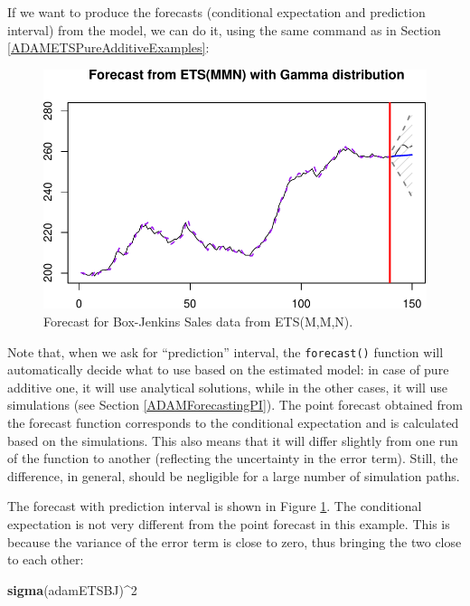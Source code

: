 \documentclass[]{book}
\newenvironment{Shaded}{\begin{snugshade}}{\end{snugshade}}
\newcommand{\DecValTok}[1]{\textcolor[rgb]{0.00,0.00,0.81}{#1}}
\newcommand{\KeywordTok}[1]{\textcolor[rgb]{0.13,0.29,0.53}{\textbf{#1}}}
\newcommand{\NormalTok}[1]{#1}
\newcommand{\OperatorTok}[1]{\textcolor[rgb]{0.81,0.36,0.00}{\textbf{#1}}}
\theoremstyle{definition}
\theoremstyle{definition}
\theoremstyle{definition}
\theoremstyle{definition}
\theoremstyle{remark}
\begin{document}
If we want to produce the forecasts (conditional expectation and prediction interval) from the model, we can do it, using the same command as in Section \ref{ADAMETSPureAdditiveExamples}:

\begin{figure}
\centering
\includegraphics{Svetunkov--2022----ADAM_files/figure-latex/BJSalesadamETSMMNForecast-1.pdf}
\caption{\label{fig:BJSalesadamETSMMNForecast}Forecast for Box-Jenkins Sales data from ETS(M,M,N).}
\end{figure}

Note that, when we ask for ``prediction'' interval, the \texttt{forecast()} function will automatically decide what to use based on the estimated model: in case of pure additive one, it will use analytical solutions, while in the other cases, it will use simulations (see Section \ref{ADAMForecastingPI}). The point forecast obtained from the forecast function corresponds to the conditional expectation and is calculated based on the simulations. This also means that it will differ slightly from one run of the function to another (reflecting the uncertainty in the error term). Still, the difference, in general, should be negligible for a large number of simulation paths.

The forecast with prediction interval is shown in Figure \ref{fig:BJSalesadamETSMMNForecast}. The conditional expectation is not very different from the point forecast in this example. This is because the variance of the error term is close to zero, thus bringing the two close to each other:

\begin{Shaded}
\begin{Highlighting}[]
\KeywordTok{sigma}\NormalTok{(adamETSBJ)}\OperatorTok{^}\DecValTok{2}
\end{Highlighting}
\end{Shaded}
\end{document}
